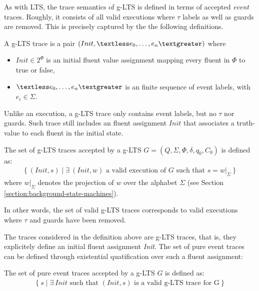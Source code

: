 As with LTS, the trace semantics of g-LTS is defined in terms of accepted \emph{event} traces. Roughly, it consists of all valid executions where $\tau$ labels as well as guards are removed. This is precisely captured by the the following definitions.

\begin{definition}
A g-LTS trace is a pair $(Init,\textless e_0,\ldots,e_n\textgreater)$ where 
\begin{itemize}
\item $Init \in 2^\Phi$ is an initial fluent value assignment mapping every fluent in $\Phi$ to true or false,
\item $\textless e_0,\ldots,e_n \textgreater$ is an finite sequence of event labels, with $e_i \in \Sigma$.
\end{itemize}
\end{definition}

Unlike an execution, a g-LTS trace only contains event labels, but no $\tau$ nor guards. Such trace still includes an fluent assignment $Init$ that associates a truth-value to each fluent in the initial state.

\begin{definition}
The set of g-LTS traces accepted by a g-LTS $G = (Q,\Sigma,\Phi,\delta,q_{0},C_{0})$ is defined as:
\begin{align*}
\{~(Init, s) \mid \exists~(Init, w) \mbox{~a valid execution of $G$ such that~} s = w|_{\Sigma}~\}
\end{align*}
where $w|_{\Sigma}$ denotes the projection of $w$ over the alphabet $\Sigma$ (see Section \ref{section:background-state-machines}).
\label{definition:valid-glts-traces}
\end{definition}

In other words, the set of valid g-LTS traces corresponds to valid executions where $\tau$ and guards have been removed. 

The traces considered in the definition above are g-LTS traces, that is, they explicitely define an initial fluent assignment \emph{Init}. The set of pure event traces can be defined through existential quatification over such a fluent assignment:

\begin{definition}
The set of pure event traces accepted by a g-LTS $G$ is defined as:
\begin{align*}
\{~ s \mid \exists~Init \mbox{~such that~} (Init,s) \mbox{~is a valid g-LTS trace for G}~\}
\end{align*}
\label{definition:glts-trace-semantics}
\end{definition}

